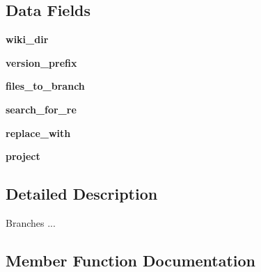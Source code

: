 \subsection*{Data Fields}
\begin{DoxyCompactItemize}
\item 
\mbox{\label{classrelease__docs_1_1WikiBrancher_ad86478c9538ac0bf3916f67eb5da2910}} 
{\bfseries wiki\+\_\+dir}
\item 
\mbox{\label{classrelease__docs_1_1WikiBrancher_aae330aeef850b105795c5d75727448ba}} 
{\bfseries version\+\_\+prefix}
\item 
\mbox{\label{classrelease__docs_1_1WikiBrancher_a938c78ba6e8adfb6af039dd500ac6466}} 
{\bfseries files\+\_\+to\+\_\+branch}
\item 
\mbox{\label{classrelease__docs_1_1WikiBrancher_a029ce9007fefd6ac5f13bacdedb29af5}} 
{\bfseries search\+\_\+for\+\_\+re}
\item 
\mbox{\label{classrelease__docs_1_1WikiBrancher_aa33d991e629cc94fbfefe4f8569e283e}} 
{\bfseries replace\+\_\+with}
\item 
\mbox{\label{classrelease__docs_1_1WikiBrancher_a4ac9c796f95690cca04049b557055443}} 
{\bfseries project}
\end{DoxyCompactItemize}


\subsection{Detailed Description}
\begin{DoxyVerb}Branches ...\end{DoxyVerb}
 

\subsection{Member Function Documentation}
\mbox{\label{classrelease__docs_1_1WikiBrancher_a5ef284f7e1742f465ecd0c14d2667327}} 
